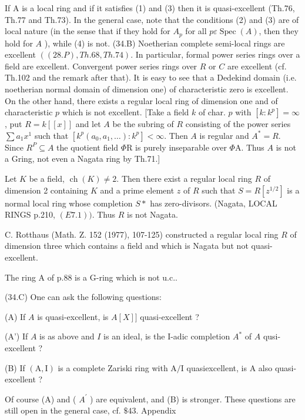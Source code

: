 If A is a local ring and if it satisfies (1) and (3) then it is quasi-excellent (Th.76, Th.77 and Th.73). In the general case, note that the conditions (2) and (3) are of local nature (in the sense that if they hold for $A_{p}$ for all $p \varepsilon \operatorname{Spec}(A)$, then they hold for $A$ ), while (4) is not. (34.B) Noetherian complete semi-local rings are excellent $((28 . P), T h .68, T h .74)$. In particular, formal power series rings over a field are excellent. Convergent power series rings over $R$ or $C$ are excellent (cf. Th.102 and the remark after that). It is easy to see that a Dedekind domain (i.e. noetherian normal domain of dimension one) of characteristic zero is excellent. On the other hand, there exists a regular local ring of dimension one and of characteristic $p$ which is not excellent. [Take a field $k$ of char. $p$ with $\left[k: k^{p}\right]=\infty$, put $R=k[[x]]$ and let $A$ be the subring of $R$ consisting of the power series $\sum a_{1} x^{1}$ such that $\left[k^{p}\left(a_{0}, a_{1}, \ldots\right): k^{p}\right]<\infty$. Then $A$ is regular and $A^{*}=R$. Since $R^{P} \subseteq A$ the quotient field $\Phi \mathrm{R}$ is purely inseparable over $\Phi \mathrm{A}$. Thus $A$ is not a Gring, not even a Nagata ring by Th.71.]

Let $K$ be a field, $\operatorname{ch}(K) \neq 2$. Then there exist a regular local ring $R$ of dimension 2 containing $K$ and a prime element $z$ of $R$ such that $S=R\left[z^{1 / 2}\right]$ is a normal local ring whose completion $S *$ has zero-divisors. (Nagata, LOCAL RINGS p.210, $(E 7.1))$. Thus $R$ is not Nagata.

C. Rotthaus (Math. Z. 152 (1977), 107-125) constructed a regular local ring $R$ of dimension three which contains a field and which is Nagata but not quasi-excellent.

The ring A of p.88 is a G-ring which is not u.c..

(34.C) One can ask the following questions:

(A) If $A$ is quasi-excellent, is $A[X]]$ quasi-excellent ?

(A') If $A$ is as above and $I$ is an ideal, is the I-adic completion $A^{*}$ of $A$ qusi-excellent ?

(B) If $(\mathrm{A}, \mathrm{I})$ is a complete Zariski ring with $\mathrm{A} / \mathrm{I}$ quasiexcellent, is A also quasi-excellent ?

Of course (A) and ( $A^{\prime}$ ) are equivalent, and (B) is stronger. These questions are still open in the general case, cf. $\$ 43$. Appendix

